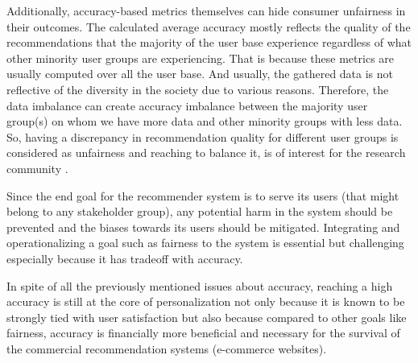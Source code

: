 Additionally, accuracy-based metrics themselves can hide consumer unfairness in their outcomes. The calculated average accuracy mostly reflects the quality of the recommendations that the majority of the user base experience regardless of what other minority user groups are experiencing. 
That is because these metrics are usually computed over all the user base. And usually, the gathered data is not reflective of the diversity in the society due to various reasons. Therefore, the data imbalance can create accuracy imbalance between the majority user group(s) on whom we have more data and other minority groups with less data. So, having a discrepancy in recommendation quality for different user groups is considered as unfairness and reaching to balance it, is of interest for the research community .

Since the end goal for the recommender system is to serve its users (that might belong to any stakeholder group), any potential harm in the system should be prevented and the biases towards its users should be mitigated. Integrating and operationalizing a goal such as fairness to the system is essential but challenging especially because it has tradeoff with accuracy.


In spite of all the previously mentioned issues about accuracy, reaching a high accuracy is still at the core of personalization not only because it is known to be strongly tied with user satisfaction but also because compared to other goals like fairness, accuracy is financially more beneficial and necessary for the survival of the commercial recommendation systems (e-commerce websites).


\begin{comment}
Although increasing accuracy for better personalization can be a double edged sword. 
On the one hand, accuracy is known to be strongly tied with user satisfaction and is financially conducive for the system. On the other hand, increase in accuracy might contribute to

The end goal for the system is to serve users and benefits them. While in many cases, due to biases in the data (such as popularity bias) or the bias propagation over time, etc. more than a certain level of accuracy will become harmful to users from other aspects. Some of these other aspects are measures by beyond-accuracy measures such as diversity, fairness, serendipity.
The previous research in the literature shows that increasing diversity in the recommendations increases user satisfaction, while we know diversity has a trade-off with accuracy.

These issue complicate the research problems more since, we need to understand these aspects of the problem in order to meticulously identify the context of the problem, the type of unfairness we can address, and the the family of solutions that we want to adopt in order to operationalize fairness in recommender systems.
\end{comment}


